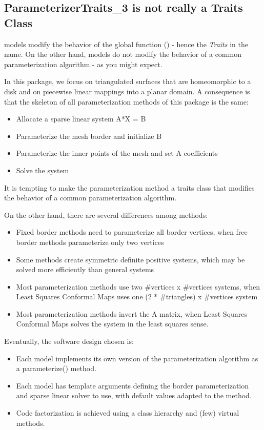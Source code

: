 \subsection{ParameterizerTraits\_3 is not really a Traits Class}

 models modify the behavior of the global function
() - hence the {\em Traits} in the name.
On the other hand,  models do not modify the behavior
of a common parameterization algorithm - as you might expect.

In this package, we focus on triangulated surfaces that are homeomorphic to a
disk and on piecewise linear mappings into a planar domain.
A consequence is that the skeleton of all parameterization methods of this
package is the same:
\begin{itemize}
\item Allocate a sparse linear system A*X = B
\item Parameterize the mesh border and initialize B
\item Parameterize the inner points of the mesh and set A coefficients
\item Solve the system
\end{itemize}

It is tempting to make the parameterization method a traits class that
modifies the behavior of a common parameterization algorithm.

On the other hand, there are several differences among methods:
\begin{itemize}
\item Fixed border methods need to parameterize all border vertices,
      when free border methods parameterize only two vertices
\item Some methods create symmetric definite positive systems,
      which may be solved more efficiently than general systems
\item Most parameterization methods use two \#vertices x \#vertices systems,
      when Least Squares Conformal Maps uses one (2 * \#triangles) x \#vertices system
\item Most parameterization methods invert the A matrix,
      when Least Squares Conformal Maps solves the system in the least squares sense.
\end{itemize}

Eventually, the software design chosen is:
\begin{itemize}
\item Each  model implements its own version
      of the parameterization algorithm as a parameterize() method.
\item Each  model has template arguments
      defining the border parameterization and sparse linear solver to use,
      with default values adapted to the method.
\item Code factorization is achieved using a class hierarchy and (few) virtual methods.
\end{itemize}

